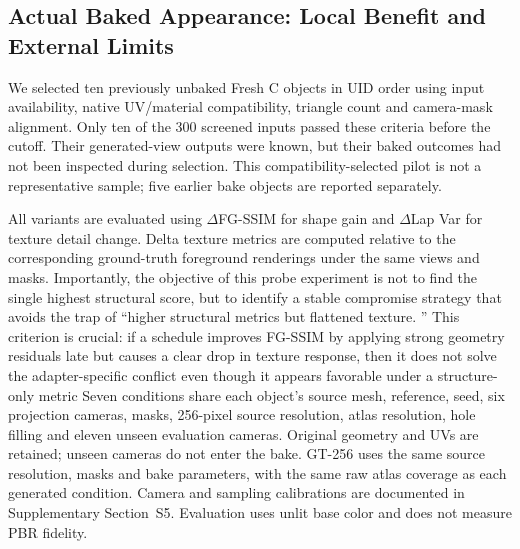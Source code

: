 \documentclass[times,twocolumn,final]{elsarticle}
\providecommand{\DIFadd}[1]{{\protect\color{blue} \sf #1}} %
\providecommand{\DIFdel}[1]{{\protect\color{red} \scriptsize #1}} %
\providecommand{\DIFaddbegin}{} %
\providecommand{\DIFaddend}{} %
\providecommand{\DIFdelbegin}{} %
\providecommand{\DIFdelend}{} %
\begin{document}
\subsection{Actual Baked Appearance: Local Benefit and External Limits}
\label{subsec:new-bake}
\DIFadd{We selected ten previously unbaked Fresh C objects in UID order using input availability, native UV/material compatibility, triangle count and camera-mask alignment. Only ten of the 300 screened inputs passed these criteria before the cutoff. Their generated-view outputs were known, but their baked outcomes had not been inspected during selection. This compatibility-selected pilot is not a representative sample; five earlier bake objects are reported separately}\DIFaddend .

\DIFdelbegin \DIFdel{All variants are evaluated using $\Delta$FG-SSIM for shape gain and $\Delta$Lap Var for texture detail change. Delta texture metrics are computed relative to the corresponding ground-truth foreground renderings under the same views and masks. Importantly, the objective of this probe experiment is not to find the single highest structural score, but to identify a stable compromise strategy that avoids the trap of ``higher structural metrics but flattened texture. '' This criterion is crucial: if a schedule improves FG-SSIM by applying strong geometry residuals late but causes a clear drop in texture response, then it does not solve the adapter-specific conflict even though it appears favorable under a structure-only metric}\DIFdelend \DIFaddbegin \DIFadd{Seven conditions share each object's source mesh, reference, seed, six projection cameras, masks, 256-pixel source resolution, atlas resolution, hole filling and eleven unseen evaluation cameras. Original geometry and UVs are retained; unseen cameras do not enter the bake. GT-256 uses the same source resolution, masks and bake parameters, with the same raw atlas coverage as each generated condition. Camera and sampling calibrations are documented in Supplementary Section~S5. Evaluation uses unlit base color and does not measure PBR fidelity}\DIFaddend .
\end{document}
